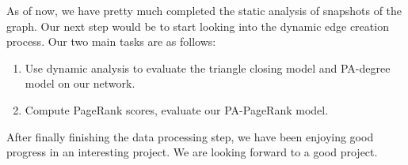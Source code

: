 \documentclass[10pt]{article}
\begin{document}
\begin{multicols}{2}
As of now, we have pretty much completed the static analysis of snapshots of the graph. Our next step would be to start looking into the dynamic edge creation process. Our two main tasks are as follows: 
\begin{enumerate}
\item Use dynamic analysis to evaluate the triangle closing model and PA-degree model on our network.
\item Compute PageRank scores, evaluate our PA-PageRank model.
\end{enumerate}

After finally finishing the data processing step, we have been enjoying good progress in an interesting project. We are looking forward to a good project.




\end{multicols}
\end{document}
